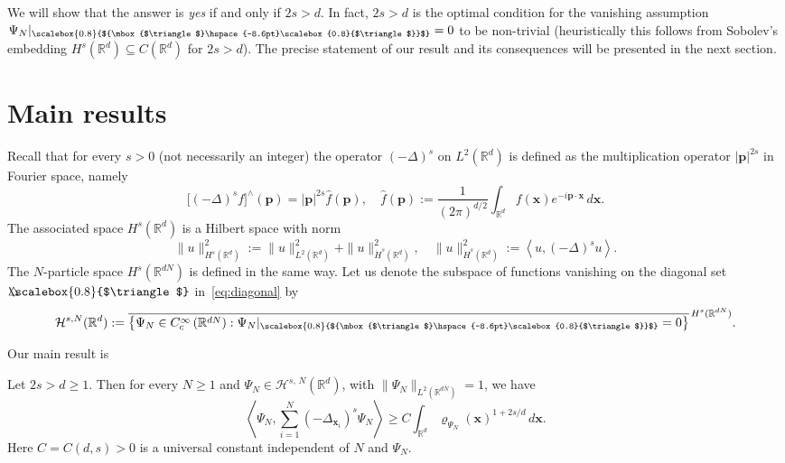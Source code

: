 \documentclass[AHL, Unicode, longabstracts, published]{cedram}
\newcommand*\R {\mathbb{R}}
\newcommand\1{{\ensuremath {\mathds 1} }}
\newcommand{\bp}{\mathbf{p}}
\newcommand{\bx}{\mathbf{x}}
\newcommand{\cH}{\mathcal{H}}
\newcommand{\bDelta}{{\mbox{$\triangle$}\hspace{-8.6pt}\scalebox{0.8}{$\triangle$}}}
\newcommand{\scriptbDelta}{\scalebox{0.8}{$\bDelta$}}
\begin{document}
We will show that the answer is \emph{yes} if and only if $2s>d$. In fact, $2s>d$ is the optimal condition for the vanishing assumption $\Psi_N\rvert_{\scriptbDelta}=0$ to be non-trivial (heuristically this follows from Sobolev's embedding $ H^{s}(\R^d)\subseteq C(\R^d)$ for $2s>d$). The precise statement of our result and its consequences will be presented in the next section.

\section{Main results}

Recall that for every $s>0$ (not necessarily an integer) the operator $(-\Delta)^s$ on $L^2(\R^d)$ is defined as the multiplication operator $|\bp|^{2s}$ in Fourier space, namely
\[
\bigl[(-\Delta)^s f\bigr]^{\!\wedge\!}(\bp)= |\bp|^{2s} \widehat{f}(\bp),
\quad \widehat{f}(\bp):= \frac{1}{(2\pi)^{d/2}}\int_{\R^d}f(\bx)e^{-i\bp\cdot\bx}\,d\bx.
\]
The associated space $H^s(\R^d)$ is a Hilbert space with norm
\[
\|u\|_{H^s(\R^d)}^2 := \|u\|_{L^2(\R^d)}^2 + \|u\|_{\dot H^s(\R^d)}^2,
\quad
\|u\|_{\dot H^s(\R^d)}^2 := \left\langle u, (-\Delta)^s u\right\rangle.
\]
The $N$-particle space $H^s(\R^{dN})$ is defined in the same way. Let us denote the subspace of functions vanishing on the diagonal set $\bDelta$ in~\eqref{eq:diagonal} by
\[
\cH^{s,N}(\R^d):= \overline{\left\{ \Psi_N \in C_c^\infty\left(\R^{dN}\right): \Psi_N\rvert_{\scriptbDelta}=0 \right\}}^{\,H^s(\R^{dN})}.
\]

\goodbreak
Our main result is
\begin{theo} \label{thm:main}
Let $2s>d\ge 1$. Then for every $N \ge 1$ and $\Psi_N\in\cH^{s,\,N}(\R^d)$, with $\|\Psi_N\|_{L^2(\R^{dN})}=1$, we have
\begin{equation}\label{eq:LT-diagonal}
\left\langle \Psi_N, \sum_{i=1}^N (-\Delta_{\bx_i})^s\Psi_N \right\rangle
\ge C\int_{\R^d} \varrho_{\Psi_N}(\bx)^{1+2s/d} \,d\bx.
\end{equation}
Here $C=C(d,s)>0$ is a universal constant independent of $N$ and $\Psi_N$.
\end{theo}
\end{document}
